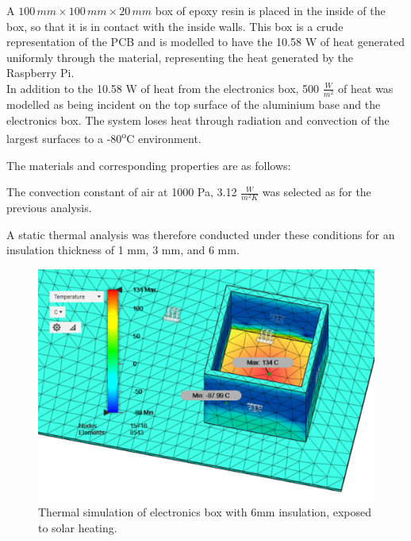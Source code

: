 A $100\,mm \times 100\,mm \times 20\,mm$ box of epoxy resin is placed in the inside of the box, so that it is in contact with the inside walls. This box is a crude representation of the PCB and is modelled to have the 10.58 W of heat generated uniformly through the material, representing the heat generated by the Raspberry Pi.\\

In addition to the 10.58 W of heat from the electronics box, 500 $\frac{W}{m^{2}}$ of heat was modelled as being incident on the top surface of the aluminium base and the electronics box. The system loses heat through radiation and convection of the largest surfaces to a -80\textsuperscript{o}C environment.

The materials and corresponding properties are as follows:



The convection constant of air at 1000 Pa, 3.12 $\frac{W}{m^2 K} $ was selected as for the previous analysis.

A static thermal analysis was therefore conducted under these conditions for an insulation thickness of 1 mm, 3 mm, and 6 mm.

	\begin{figure}[H]
    \centering	
	\includegraphics[scale=0.58]{4-experiment-design/img/mechanical/6mmthickheat.PNG}
	\caption{Thermal simulation of electronics box with 6mm insulation, exposed to solar heating.}
	\label{fig:6mmthickheat}
    	\end{figure}

